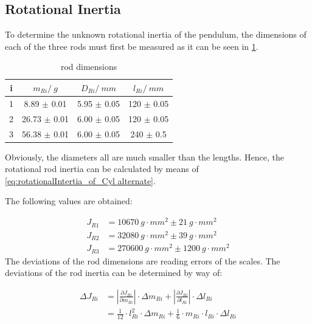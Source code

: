         \subsection{Rotational Inertia}
            To determine the unknown rotational inertia of the pendulum, the dimensions of each of the three rods must first be measured
            as it can be seen in \cref{rod dimensions}.\par
            \begin{table}[H]
                \centering
                \caption{rod dimensions}
                \label{rod dimensions}
                \begin{tabular}{|c|c|c|c|}
                    \hline
                    i & $ m_{Ri} / \SI{}{g} $ & $ D_{Ri} / \SI{}{mm} $ & $ l_{Ri} / \SI{}{mm} $ \\
                    \hline
                    \hline
                    1 & 8.89 $\pm$ 0.01 & 5.95 $\pm$ 0.05 & 120 $\pm$ 0.05 \\
                    \hline
                    2 & 26.73 $\pm$ 0.01 & 6.00 $\pm$ 0.05 & 120 $\pm$ 0.05 \\
                    \hline
                    3 & 56.38 $\pm$ 0.01 & 6.00 $\pm$ 0.05 & 240 $\pm$ 0.5 \\
                    \hline
                \end{tabular}
            \end{table}
            Obviously, the diameters all are much smaller than the lengths. Hence, the rotational rod inertia can be calculated
            by means of \cref{eq:rotationalIntertia_of_Cyl alternate}.\par
            The following values are obtained:\par
            \begin{align}
                J_{R1}  &=\SI{10670}{g\cdot mm^2} \pm \SI{21}{g\cdot mm^2}\\
                J_{R2}  &=\SI{32080}{g\cdot mm^2} \pm \SI{39}{g\cdot mm^2}\\
                J_{R3}  &=\SI{270600}{g\cdot mm^2} \pm \SI{1200}{g\cdot mm^2}
            \end{align}
            The deviations of the rod dimensions are reading errors of the scales. The deviations of the rod inertia can be determined by way of:\par
            \begin{align}
                \Delta J_{Ri}   &=\left| \frac{\partial J_{Ri}}{\partial m_{Ri}} \right| \cdot \Delta m_{Ri} + \left| \frac{\partial J_{Ri}}{\partial l_{Ri}} \right| \cdot \Delta l_{Ri} \nonumber\\
                                &=\frac{1}{12}\cdot l_{Ri}^2\cdot \Delta m_{Ri} + \frac{1}{6}\cdot m_{Ri}\cdot l_{Ri}\cdot \Delta l_{Ri}
            \end{align}
